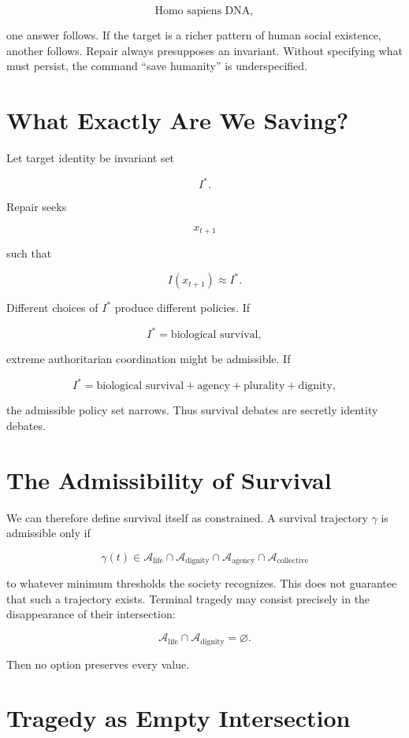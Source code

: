 \documentclass[11pt,oneside]{book}
\theoremstyle{definition}
\theoremstyle{remark}
\newcommand{\A}{\mathcal{A}}
\begin{document}
\[
\text{Homo sapiens DNA},
\]

one answer follows. If the target is a richer pattern of human social existence, another follows.
Repair always presupposes an invariant. Without specifying what must persist, the command ``save
humanity'' is underspecified.

\section{What Exactly Are We Saving?}

Let target identity be invariant set

\[
I^\ast.
\]

Repair seeks

\[
x_{t+1}
\]

such that

\[
I(x_{t+1})\approx I^\ast.
\]

Different choices of \(I^\ast\) produce different policies. If

\[
I^\ast=\text{biological survival},
\]

extreme authoritarian coordination might be admissible. If

\[
I^\ast= \text{biological survival} + \text{agency} + \text{plurality} + \text{dignity},
\]

the admissible policy set narrows. Thus survival debates are secretly identity debates.

\section{The Admissibility of Survival}

We can therefore define survival itself as constrained. A survival trajectory \(\gamma\) is
admissible only if

\[
\gamma(t)\in \A_{\mathrm{life}} \cap \A_{\mathrm{dignity}} \cap \A_{\mathrm{agency}} \cap \A_{\mathrm{collective}}
\]

to whatever minimum thresholds the society recognizes. This does not guarantee that such a
trajectory exists. Terminal tragedy may consist precisely in the disappearance of their
intersection:

\[
\A_{\mathrm{life}} \cap \A_{\mathrm{dignity}} = \varnothing.
\]

Then no option preserves every value.

\section{Tragedy as Empty Intersection}
\end{document}
